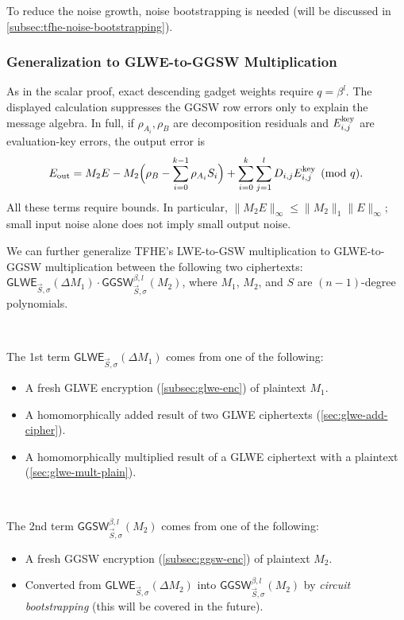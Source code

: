 To reduce the noise growth, noise bootstrapping is needed (will be discussed in \autoref{subsec:tfhe-noise-bootstrapping}).

\subsubsection{Generalization to GLWE-to-GGSW Multiplication}
\label{subsubsec:tfhe-glwe-to-ggsw-multiplication}

As in the scalar proof, exact descending gadget weights require $q=\beta^l$. The displayed calculation suppresses the GGSW row errors only to explain the message algebra. In full, if $\rho_{A_i},\rho_B$ are decomposition residuals and $E_{i,j}^{\rm key}$ are evaluation-key errors, the output error is
\[
E_{\rm out}=M_2E-M_2\Bigl(\rho_B-\sum_{i=0}^{k-1}\rho_{A_i}S_i\Bigr)+\sum_{i=0}^{k}\sum_{j=1}^{l}D_{i,j}E_{i,j}^{\rm key}\pmod q.
\]
All these terms require bounds. In particular, $\|M_2E\|_\infty\leq\|M_2\|_1\|E\|_\infty$; small input noise alone does not imply small output noise.

We can further generalize TFHE's LWE-to-GSW multiplication to GLWE-to-GGSW multiplication between the following two ciphertexts: $\textsf{GLWE}_{\vec{S}, \sigma}(\Delta M_1) \cdot \textsf{GGSW}_{\vec{S}, \sigma}^{\beta, l}(M_2)$, where $M_1$, $M_2$, and $S$ are $(n-1)$-degree polynomials. 


$ $

\noindent The 1st term $\textsf{GLWE}_{\vec{S}, \sigma}(\Delta M_1)$ comes from one of the following: 
\begin{itemize}
\item A fresh GLWE encryption (\autoref{subsec:glwe-enc}) of plaintext $M_1$. 
\item A homomorphically added result of two GLWE ciphertexts (\autoref{sec:glwe-add-cipher}). 
\item A homomorphically multiplied result of a GLWE ciphertext with a plaintext (\autoref{sec:glwe-mult-plain}). 
\end{itemize}

$ $

\noindent The 2nd term $\textsf{GGSW}_{\vec{S}, \sigma}^{\beta, l}(M_2)$ comes from one of the following:
\begin{itemize}
\item A fresh GGSW encryption (\autoref{subsec:ggsw-enc}) of plaintext $M_2$.
\item Converted from $\textsf{GLWE}_{\vec{S}, \sigma}(\Delta M_2)$ into $\textsf{GGSW}_{\vec{S}, \sigma}^{\beta, l}(M_2)$ by \textit{circuit bootstrapping} (this will be covered in the future).
\end{itemize}

